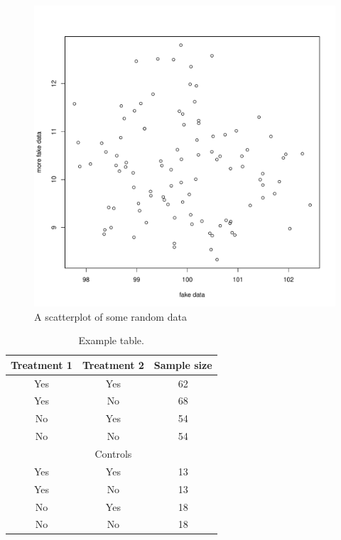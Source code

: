 \documentclass[letterpaper, 12pt]{article}
\begin{document}




\pagebreak
\begin{figure}[H]
    \centering
    \includegraphics[width=0.9\linewidth]{./results/scatterplot.pdf}
  \captionsetup{width=0.75\textwidth}
  \caption{A scatterplot of some random data}
    	\label{fig:scatterplot} %
\end{figure}

\pagebreak
\begin{table}[H]
    \centering
	\caption{Example table.}
	\label{table:simpleExample}
	\begin{tabular}{ccc} %
    \hline
	Treatment 1 & Treatment 2 & Sample size \\
    \hline
	 Yes & Yes & 62\\
	 Yes & No & 68\\
	 No & Yes & 54\\
	 No & No & 54\\
	 \hline
    & Controls & \\
    \hline
     Yes & Yes & 13\\
	 Yes & No & 13\\
	 No & Yes & 18\\
	 No & No & 18\\
	\hline
	\end{tabular}
\end{table}
\end{document}
